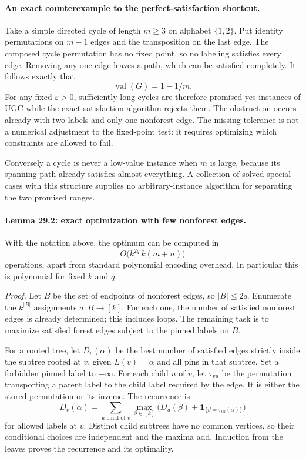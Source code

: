 \documentclass[11pt]{article}
\begin{document}
\paragraph{An exact counterexample to the perfect-satisfaction shortcut.}
Take a simple directed cycle of length $m\ge3$ on alphabet $\{1,2\}$.
Put identity permutations on $m-1$ edges and the transposition on the last
edge. The composed cycle permutation has no fixed point, so no labeling
satisfies every edge. Removing any one edge leaves a path, which can be
satisfied completely. It follows exactly that
\[
                         \operatorname{val}(G)=1-1/m.
\]
For any fixed $\varepsilon>0$, sufficiently long cycles are therefore
promised yes-instances of UGC while the exact-satisfaction algorithm rejects
them. The obstruction occurs already with two labels and only one nonforest
edge. The missing tolerance is not a numerical adjustment to the fixed-point
test: it requires optimizing which constraints are allowed to fail.

Conversely a cycle is never a low-value instance when $m$ is large, because
its spanning path already satisfies almost everything. A collection of
solved special cases with this structure supplies no arbitrary-instance
algorithm for separating the two promised ranges.

\paragraph{Lemma 29.2: exact optimization with few nonforest edges.}
With the notation above, the optimum can be computed in
\begin{equation}\label{a29:algorithm}
                     O\bigl(k^{2q}\,k(m+n)\bigr)
\end{equation}
operations, apart from standard polynomial encoding overhead.
In particular this is polynomial for fixed $k$ and $q$.

\emph{Proof.} Let $B$ be the set of endpoints of nonforest edges, so
$|B|\le2q$. Enumerate the $k^{|B|}$ assignments $a:B\to[k]$.
For each one, the number of satisfied nonforest edges is already determined;
this includes loops. The remaining task is to maximize satisfied forest
edges subject to the pinned labels on $B$.

For a rooted tree, let $D_v(\alpha)$ be the best number of satisfied edges
strictly inside the subtree rooted at $v$, given $L(v)=\alpha$ and all
pins in that subtree. Set a forbidden pinned label to $-\infty$.
For each child $u$ of $v$, let $\tau_{vu}$ be the permutation transporting
a parent label to the child label required by the edge. It is either the
stored permutation or its inverse. The recurrence is
\[
 D_v(\alpha)=\sum_{u\text{ child of }v}
       \max_{\beta\in[k]}
       \bigl(D_u(\beta)+\mathbf1_{\{\beta=\tau_{vu}(\alpha)\}}\bigr)
\]
for allowed labels at $v$. Distinct child subtrees have no common vertices,
so their conditional choices are independent and the maxima add. Induction
from the leaves proves the recurrence and its optimality.
\end{document}
